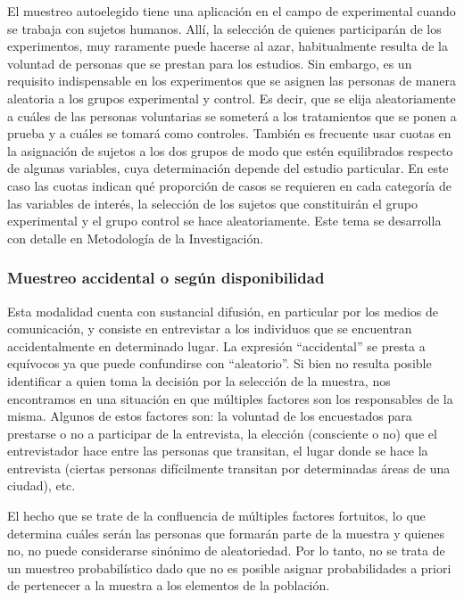 \documentclass[]{article}
\begin{document}
El muestreo autoelegido tiene una aplicación en el campo de experimental
cuando se trabaja con sujetos humanos. Allí, la selección de quienes
participarán de los experimentos, muy raramente puede hacerse al azar,
habitualmente resulta de la voluntad de personas que se prestan para los
estudios. Sin embargo, es un requisito indispensable en los experimentos
que se asignen las personas de manera aleatoria a los grupos
experimental y control. Es decir, que se elija aleatoriamente a cuáles
de las personas voluntarias se someterá a los tratamientos que se ponen
a prueba y a cuáles se tomará como controles. También es frecuente usar
cuotas en la asignación de sujetos a los dos grupos de modo que estén
equilibrados respecto de algunas variables, cuya determinación depende
del estudio particular. En este caso las cuotas indican qué proporción
de casos se requieren en cada categoría de las variables de interés, la
selección de los sujetos que constituirán el grupo experimental y el
grupo control se hace aleatoriamente. Este tema se desarrolla con
detalle en Metodología de la Investigación.

\hypertarget{muestreo-accidental-o-segun-disponibilidad}{%
\subsubsection{Muestreo accidental o según disponibilidad}\label{muestreo-accidental-o-segun-disponibilidad}}

Esta modalidad cuenta con sustancial difusión, en particular por los
medios de comunicación, y consiste en entrevistar a los individuos que
se encuentran accidentalmente en determinado lugar. La expresión
``accidental'' se presta a equívocos ya que puede confundirse con
``aleatorio''. Si bien no resulta posible identificar a quien toma la
decisión por la selección de la muestra, nos encontramos en una
situación en que múltiples factores son los responsables de la misma.
Algunos de estos factores son: la voluntad de los encuestados para
prestarse o no a participar de la entrevista, la elección (consciente o
no) que el entrevistador hace entre las personas que transitan, el lugar
donde se hace la entrevista (ciertas personas difícilmente transitan por
determinadas áreas de una ciudad), etc.

El hecho que se trate de la confluencia de múltiples factores fortuitos,
lo que determina cuáles serán las personas que formarán parte de la
muestra y quienes no, no puede considerarse sinónimo de aleatoriedad.
Por lo tanto, no se trata de un muestreo probabilístico dado que no es
posible asignar probabilidades a priori de pertenecer a la muestra a los
elementos de la población.
\end{document}
